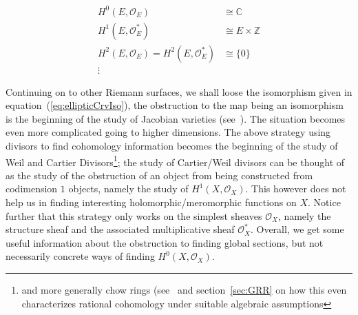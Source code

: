 \documentclass{book}
\newcommand{\C}{{\mathbb{C}}}
\newcommand{\Z}{{\mathbb{Z}}}
\newcommand{\CO}{{\mathcal{O}}}
\begin{document}
\begin{align*}
  H^0(E, \CO_{E}) &\cong \C\\
  H^1(E, \CO_{E}^*) &\cong E\times \Z\\
  H^2(E, \CO_{E}) = H^2(E, \CO_{E}^*)&\cong \{0\}\\
  \vdots
\end{align*}

Continuing on to other Riemann surfaces, we shall loose the isomorphism given in
equation~(\ref{eq:ellipticCrvIso}), the obstruction to the map being an isomorphism is the beginning of the
study of Jacobian varieties (see~\cite[section~6.4]{NateComplexAnalysis}). The situation becomes even more
complicated going to higher dimensions. The above strategy using divisors to find cohomology information
becomes the beginning of the study of Weil and Cartier Divisors\footnote{and more generally chow rings
  (see~\cite{NateAlgGeo} and section~\ref{sec:GRR} on how this even characterizes rational cohomology under
suitable algebraic assumptions}; the study of Cartier/Weil divisors can be thought of as the study of the
obstruction of an object from being constructed from codimension $1$ objects, namely the study of $H^1(X,
\CO_X)$. This however does not help us in finding interesting holomorphic/meromorphic functions on $X$. Notice
further that this strategy only works on the simplest sheaves $\CO_X$, namely the structure sheaf and the
associated multiplicative sheaf $\CO_X^*$. Overall, we get some useful information about the obstruction to
finding global sections, but not necessarily concrete ways of finding $H^0(X, \CO_X)$.
\end{document}
